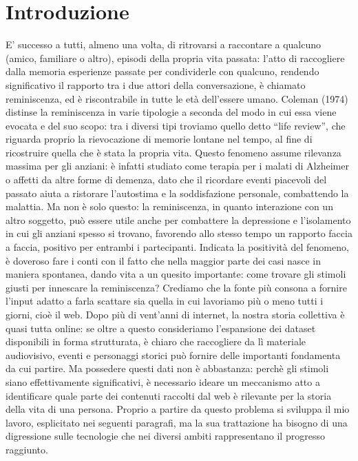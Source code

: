 \documentclass[sigproc-sp.tex]{subfiles}
\begin{document}
\section{Introduzione}
E’ successo a tutti, almeno una volta, di ritrovarsi a raccontare a qualcuno (amico, familiare o altro), episodi della propria vita passata: l’atto di raccogliere dalla memoria esperienze passate per condividerle con qualcuno, rendendo significativo il rapporto tra i due attori della conversazione, è chiamato reminiscenza, ed è riscontrabile in tutte le età dell’essere umano. Coleman (1974) distinse la reminiscenza in varie tipologie a seconda del modo in cui essa viene evocata e del suo scopo: tra i diversi tipi troviamo quello detto “life review”, che riguarda proprio la rievocazione di memorie lontane nel tempo, al fine di ricostruire quella che è stata la propria vita. Questo fenomeno assume rilevanza massima per gli anziani: è infatti studiato come terapia per i malati di Alzheimer o affetti da altre forme di demenza, dato che il ricordare eventi piacevoli del passato aiuta a ristorare l’autostima e la soddisfazione personale, combattendo la malattia. Ma non è solo questo: la reminiscenza, in quanto interazione con un altro soggetto, può essere utile anche per combattere la depressione e l’isolamento in cui gli anziani spesso si trovano, favorendo allo stesso tempo un rapporto faccia a faccia, positivo per entrambi i partecipanti.
Indicata la positività del fenomeno, è doveroso fare i conti con il fatto che nella maggior parte dei casi nasce in maniera spontanea, dando vita a un quesito importante: come trovare gli stimoli giusti per innescare la reminiscenza? Crediamo che la fonte più consona a fornire l’input adatto a farla scattare sia quella in cui lavoriamo più o meno tutti i giorni, cioè il web. Dopo più di vent’anni di internet, la nostra storia collettiva è quasi tutta online: se oltre a questo consideriamo l’espansione dei dataset disponibili in forma strutturata, è chiaro che raccogliere da lì materiale audiovisivo, eventi e personaggi storici può fornire delle importanti fondamenta da cui partire.
Ma possedere questi dati non è abbastanza: perchè gli stimoli siano effettivamente significativi, è necessario ideare un meccanismo atto a identificare quale parte dei contenuti raccolti dal web è rilevante per la storia della vita di una persona. Proprio a partire da questo problema si sviluppa il mio lavoro, esplicitato nei seguenti paragrafi, ma la sua trattazione ha bisogno di una digressione sulle tecnologie che nei diversi ambiti rappresentano il progresso raggiunto.
\end{document}
